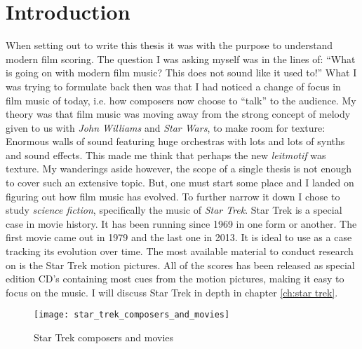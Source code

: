 
\chapter{Introduction}\label{ch:introduction}

When setting out to write this thesis it was with the purpose to understand modern film scoring. The question I was asking myself was in the lines of: ``What is going on with modern film music? This does not sound like it used to!'' What I was trying to formulate back then was that I had noticed a change of focus in film music of today, i.e. how composers now choose to ``talk'' to the audience. My theory was that film music was moving away from the strong concept of melody given to us with \textit{John Williams} and \textit{Star Wars}, to make room for texture: Enormous walls of sound featuring huge orchestras with lots and lots of synths and sound effects. This made me think that perhaps the new \textit{leitmotif} was texture. My wanderings aside however, the scope of a single thesis is not enough to cover such an extensive topic. But, one must start some place and I landed on figuring out how film music has evolved. To further narrow it down I chose to study \textit{science fiction}, specifically the music of \textit{Star Trek}. Star Trek is a special case in movie history. It has been running since 1969 in one form or another. The first movie came out in 1979 and the last one in 2013. It is ideal to use as a case tracking its evolution over time. The most available material to conduct research on is the Star Trek motion pictures. All of the scores has been released as special edition CD's containing most cues from the motion pictures, making it easy to focus on the music. I will discuss Star Trek in depth in chapter \ref{ch:star trek}.

\begin{figure}
\texttt{[image: star\_trek\_composers\_and\_movies]}
	\caption{Star Trek composers and movies}
	\label{fg:st composers}
\end{figure}

